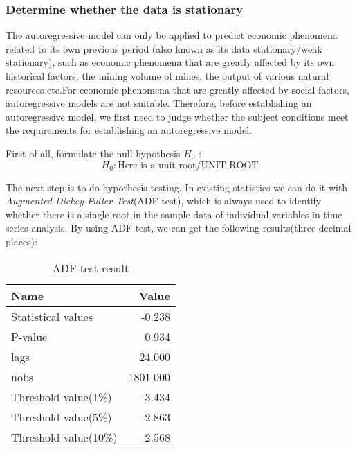 \documentclass{mcmthesis}
\begin{document}
\subsubsection{Determine whether the data is stationary}
The autoregressive model can only be applied to predict economic phenomena related to its own previous period (also known as its data stationary/weak stationary), such as economic phenomena that are greatly affected by its own historical factors, the mining volume of mines, the output of various natural resources etc.For economic phenomena that are greatly affected by social factors, autoregressive models are not suitable. Therefore, before establishing an autoregressive model, we first need to judge whether the subject conditions meet the requirements for establishing an autoregressive model.

First of all, formulate the null hypothesis $H_0$ :
\[
 H_0 : \mbox{Here is a unit root/UNIT ROOT}
\]

The next step is to do hypothesis testing.
In existing statistics we can do it with \textit{Augmented Dickey-Fuller Test}(ADF test), which is always used to identify whether there is a single root in the sample data of individual variables in time series analysis.
By using ADF test, we can get the following results(three decimal places):

\begin{table}[H]
  \centering
  \begin{tabular}{@{}lr@{}}
    \toprule
    Name & Value \\
    \midrule
    Statistical values & -0.238 \\
    P-value & 0.934 \\
    lags & 24.000 \\
    nobs & 1801.000 \\
    Threshold value(1\%) & -3.434 \\
    Threshold value(5\%) & -2.863 \\
    Threshold value(10\%) & -2.568 \\
    \bottomrule
  \end{tabular}
  \caption{ADF test result}
\end{table}
\end{document}
